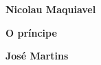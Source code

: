 \textbf{Nicolau Maquiavel} \lipsum[1]

\textbf{O príncipe} \lipsum[1]

\textbf{José Martins} \lipsum[1]


